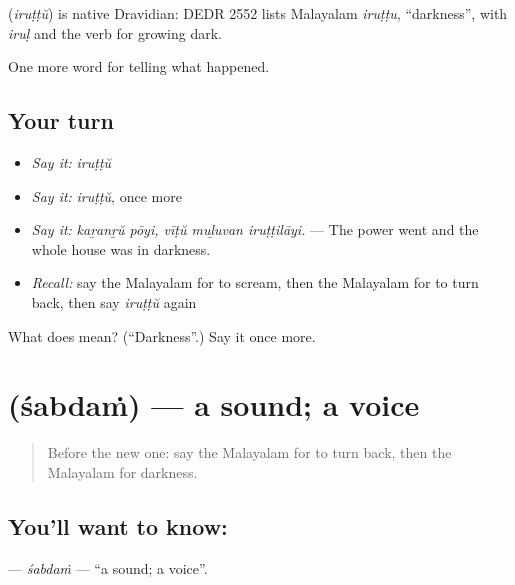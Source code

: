 \begin{cousinweb}
\textbf{} (\emph{iruṭṭŭ}) is native Dravidian: DEDR 2552 lists Malayalam \emph{iruṭṭu}, \textquotedblleft{}darkness\textquotedblright{}, with \emph{iruḷ} and the verb for growing dark.
\end{cousinweb}

\begin{grammarlens}[title={What you've built}]
One more word for telling what happened.
\end{grammarlens}

\subsection*{Your turn}
\begin{itemize}
\raggedright
  \item \emph{Say it:} \emph{iruṭṭŭ}
  \item \emph{Say it:} \emph{iruṭṭŭ}, once more
  \item \emph{Say it:} \emph{kaṟanṟŭ pōyi, vīṭŭ muḻuvan iruṭṭilāyi.} — The power went and the whole house was in darkness.
  \item \emph{Recall:} say the Malayalam for to scream, then the Malayalam for to turn back, then say \emph{iruṭṭŭ} again
\end{itemize}

\begin{tcolorbox}[breakable,colback=teal!4,colframe=teal!35!black,title={Before you move on}]
What does  mean? (\textquotedblleft{}Darkness\textquotedblright{}.) Say it once more.
\end{tcolorbox}
\section[\texorpdfstring{\ml{ശബ്ദം} (śabdaṁ)}{ശബ്ദം (śabdaṁ)}]{ (śabdaṁ) — a sound; a voice}

\label{lesson:ML-C381-sabdam}



\begin{quote}
Before the new one: say the Malayalam for to turn back, then the Malayalam for darkness.
\end{quote}

\subsection*{You'll want to know: }
\textbf{} — \emph{śabdaṁ} — \textquotedblleft{}a sound; a voice\textquotedblright{}.

